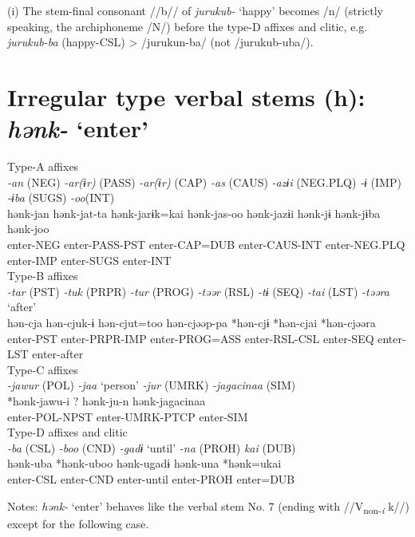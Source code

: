 (i)  The stem-final consonant //b// of \textit{jurukub-} ‘happy’ becomes /n/ (strictly speaking, the archiphoneme /N/) before the type-D affixes and clitic, e.g. \textit{jurukub-ba} (happy-CSL) > /jurukun-ba/ (not /jurukub-uba/).

\section{Irregular type verbal stems (h): \textit{hənk-} ‘enter’}

\ea Type-A affixes\\
\glll \textit{-an} (NEG)  \textit{-ar(ɨr)} (PASS)  \textit{-ar(ɨr)} (CAP)  \textit{-as} (CAUS)  \textit{-azɨi} (NEG.PLQ)  \textit{-ɨ} (IMP)  \textit{-ɨba} (SUGS)  \textit{-oo}(INT)\\
hənk-jan  hənk-jat-ta  hənk-jarɨk=kai  hənk-jas-oo  hənk-jazɨi  hənk-jɨ  hənk-jɨba  hənk-joo\\
enter-NEG  enter-PASS-PST  enter-CAP=DUB  enter-CAUS-INT  enter-NEG.PLQ  enter-IMP  enter-SUGS  enter-INT\\


\ex Type-B affixes\\
\glll \textit{-tar} (PST)  \textit{-tuk} (PRPR)  \textit{-tur} (PROG)  \textit{-təər} (RSL)  \textit{-tɨ} (SEQ)  \textit{-tai} (LST)  \textit{-təəra} ‘after’\\
hən-cja  hən-cjuk-ɨ  hən-cjut=too  hən-cjəəp-pa  *hən-cjɨ  *hən-cjai  *hən-cjəəra\\
enter-PST  enter-PRPR-IMP  enter-PROG=ASS  enter-RSL-CSL  enter-SEQ  enter-LST  enter-after\\


\ex Type-C affixes\\
\glll \textit{-jawur} (POL)  \textit{-jaa} ‘person’  \textit{-jur} (UMRK)  \textit{-jagacinaa} (SIM)\\
*hənk-jawu-i  ?  hənk-ju-n  hənk-jagacinaa\\
enter-POL-NPST    enter-UMRK-PTCP  enter-SIM\\


\ex Type-D affixes and clitic\\
\glll \textit{-ba} (CSL)  \textit{-boo} (CND)  \textit{-gadɨ} ‘until’  \textit{-na} (PROH)  \textit{kai} (DUB)\\
hənk-uba  *hənk-uboo  hənk-ugadɨ  hənk-una  *hənk=ukai\\
enter-CSL  enter-CND  enter-until  enter-PROH  enter=DUB\\
\z

Notes: \textit{hənk-} ‘enter’ behaves like the verbal stem No. 7 (ending with //V\textsubscript{non-}\textit{\textsubscript{i}} k//) except for the following case.

